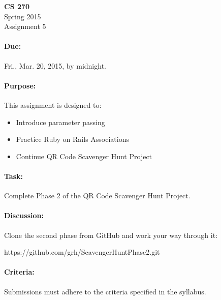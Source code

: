 \documentclass[11pt]{article}
\begin{document}
    \begin{center}

        \large\textbf{CS 270} \\
        Spring 2015 \\
        Assignment 5 \\

    \end{center}

    \paragraph{Due:} Fri., Mar. 20, 2015, by midnight.

    \paragraph{Purpose:} This assignment is designed to:

        \begin{itemize}

            \item Introduce parameter passing

            \item Practice Ruby on Rails Associations

            \item Continue QR Code Scavenger Hunt Project

        \end{itemize}

    \paragraph{Task:} Complete Phase 2 of the QR Code Scavenger Hunt
    Project.
    
    \paragraph{Discussion:} Clone the second phase from
    GitHub and work your way through it:

    \begin{center}

        https://github.com/grh/ScavengerHuntPhase2.git

    \end{center}

    \paragraph{Criteria:} Submissions must adhere to the criteria
    specified in the syllabus.
\end{document}
